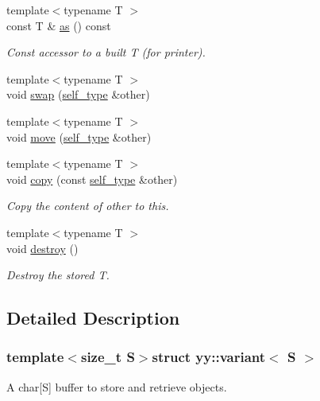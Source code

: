 \begin{DoxyCompactItemize}
{\footnotesize template$<$typename T $>$ }\\const T \& \hyperlink{structyy_1_1variant_a7930977f8a1b707c687daec8b0d76e70}{as} () const 
\begin{DoxyCompactList}\small\item\em Const accessor to a built {\itshape T} (for printer). \end{DoxyCompactList}\item 
{\footnotesize template$<$typename T $>$ }\\void \hyperlink{structyy_1_1variant_ac43b5ffdcedbda5462c53832027707ac}{swap} (\hyperlink{structyy_1_1variant_afbd75aee339bd9fa06e6fa8f320cecd3}{self\-\_\-type} \&other)
\item 
{\footnotesize template$<$typename T $>$ }\\void \hyperlink{structyy_1_1variant_ae71b4ef21f1446b328b9d93dbc6806e1}{move} (\hyperlink{structyy_1_1variant_afbd75aee339bd9fa06e6fa8f320cecd3}{self\-\_\-type} \&other)
\item 
{\footnotesize template$<$typename T $>$ }\\void \hyperlink{structyy_1_1variant_a526d966e2923f6ae1d3fab2e1eac5311}{copy} (const \hyperlink{structyy_1_1variant_afbd75aee339bd9fa06e6fa8f320cecd3}{self\-\_\-type} \&other)
\begin{DoxyCompactList}\small\item\em Copy the content of {\itshape other} to this. \end{DoxyCompactList}\item 
{\footnotesize template$<$typename T $>$ }\\void \hyperlink{structyy_1_1variant_a20a07d58bf12eda819ad013c5d9853cb}{destroy} ()
\begin{DoxyCompactList}\small\item\em Destroy the stored {\itshape T}. \end{DoxyCompactList}\end{DoxyCompactItemize}


\subsection{Detailed Description}
\subsubsection*{template$<$size\-\_\-t S$>$struct yy\-::variant$<$ S $>$}

A char\mbox{[}S\mbox{]} buffer to store and retrieve objects.

